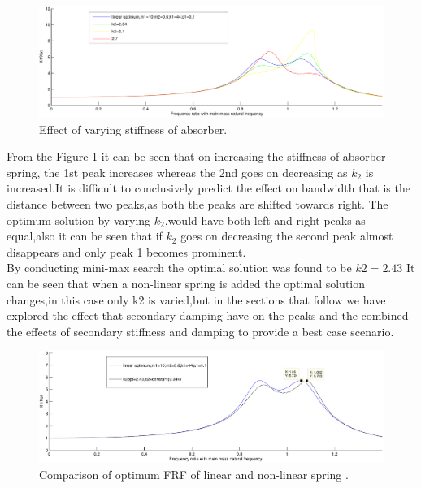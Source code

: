 \begin{figure}[h!]
\includegraphics[width=\textwidth,height=0.5\textwidth]{"figures/nonlinearity_primaryymass_3_effect of secondaryspring"}
  \caption{Effect of varying stiffness of absorber.}
  \label{fig:varying stiffness of absorber}
  \end{figure}
From the Figure \ref{fig:varying stiffness of absorber} it can be seen that on increasing the stiffness of absorber spring, the 1st peak increases whereas the 2nd  goes on decreasing as $k_2$ is increased.It is difficult to conclusively predict the effect on bandwidth that is the distance between two peaks,as both the peaks are shifted towards right.
The optimum solution by varying $k_2$,would have both left and right peaks as equal,also it can be seen that if $k_2$ goes on decreasing the second peak almost disappears and only peak 1 becomes prominent.\\
By conducting mini-max search the optimal solution was found to be $k2=2.43$ It can be seen that when a non-linear spring is added the optimal solution changes,in this case only k2 is varied,but in the sections that follow we have explored the effect that secondary damping have on the peaks and the combined the effects of secondary stiffness and damping to provide a best case scenario.\\
  

\begin{figure}[h!]
  \includegraphics[width=\textwidth,height=0.5\textwidth]{"figures/nonlinearity_primaryymass_3b_effect of secondaryspring_only optimums"}
  \caption{Comparison of optimum FRF of linear and non-linear spring .}
  \label{fig:optimum stiffness}
\end{figure}


